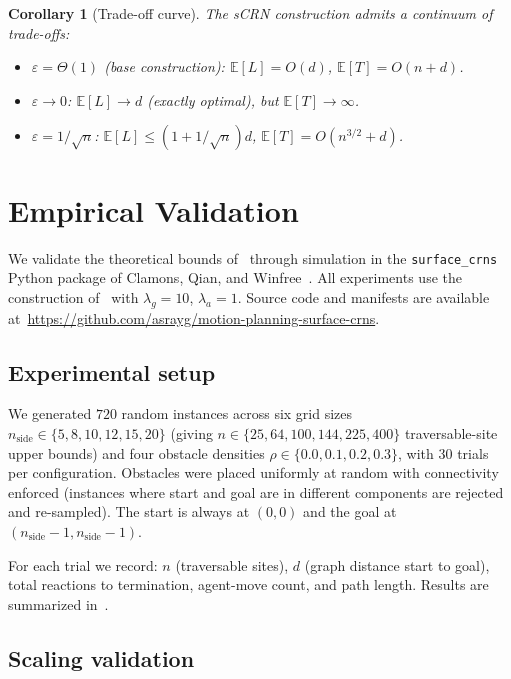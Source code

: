 \documentclass[11pt]{article}
\theoremstyle{plain}
\newtheorem{corollary}[theorem]{Corollary}
\theoremstyle{definition}
\theoremstyle{remark}
\begin{document}
\begin{corollary}[Trade-off curve]
\label{cor:epsilon-tradeoff}
The sCRN construction admits a continuum of trade-offs:
\begin{itemize}
    \item $\varepsilon = \Theta(1)$ (base construction): $\mathbb{E}[L] = O(d)$, $\mathbb{E}[T] = O(n + d)$.
    \item $\varepsilon \to 0$: $\mathbb{E}[L] \to d$ (exactly optimal), but $\mathbb{E}[T] \to \infty$.
    \item $\varepsilon = 1/\sqrt{n}$: $\mathbb{E}[L] \leq (1 + 1/\sqrt{n}) d$, $\mathbb{E}[T] = O(n^{3/2} + d)$.
\end{itemize}
\end{corollary}

\section{Empirical Validation}
\label{sec:experiments}

We validate the theoretical bounds of~ through simulation in the \texttt{surface\_crns} Python package of Clamons, Qian, and Winfree~\cite{clamons2020}. All experiments use the construction of~ with $\lambda_g = 10$, $\lambda_a = 1$. Source code and manifests are available at~\url{https://github.com/asrayg/motion-planning-surface-crns}.

\subsection{Experimental setup}

We generated $720$ random instances across six grid sizes $n_{\text{side}} \in \{5, 8, 10, 12, 15, 20\}$ (giving $n \in \{25, 64, 100, 144, 225, 400\}$ traversable-site upper bounds) and four obstacle densities $\rho \in \{0.0, 0.1, 0.2, 0.3\}$, with $30$ trials per configuration. Obstacles were placed uniformly at random with connectivity enforced (instances where start and goal are in different components are rejected and re-sampled). The start is always at $(0, 0)$ and the goal at $(n_{\text{side}}-1, n_{\text{side}}-1)$.

For each trial we record: $n$ (traversable sites), $d$ (graph distance start to goal), total reactions to termination, agent-move count, and path length. Results are summarized in~.

\subsection{Scaling validation}
\end{document}
